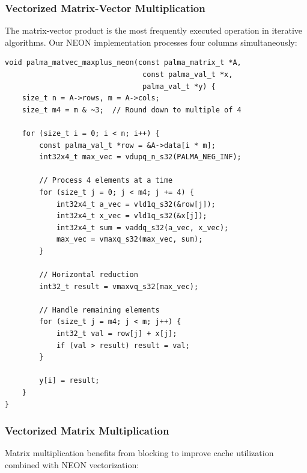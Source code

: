 \documentclass[11pt,a4paper]{article}
\theoremstyle{plain}
\theoremstyle{definition}
\begin{document}
\subsubsection{Vectorized Matrix-Vector Multiplication}

The matrix-vector product is the most frequently executed operation in iterative algorithms. Our NEON implementation processes four columns simultaneously:

\begin{lstlisting}[caption={NEON-optimized matrix-vector multiplication (max-plus)}]
void palma_matvec_maxplus_neon(const palma_matrix_t *A,
                                const palma_val_t *x,
                                palma_val_t *y) {
    size_t n = A->rows, m = A->cols;
    size_t m4 = m & ~3;  // Round down to multiple of 4
    
    for (size_t i = 0; i < n; i++) {
        const palma_val_t *row = &A->data[i * m];
        int32x4_t max_vec = vdupq_n_s32(PALMA_NEG_INF);
        
        // Process 4 elements at a time
        for (size_t j = 0; j < m4; j += 4) {
            int32x4_t a_vec = vld1q_s32(&row[j]);
            int32x4_t x_vec = vld1q_s32(&x[j]);
            int32x4_t sum = vaddq_s32(a_vec, x_vec);
            max_vec = vmaxq_s32(max_vec, sum);
        }
        
        // Horizontal reduction
        int32_t result = vmaxvq_s32(max_vec);
        
        // Handle remaining elements
        for (size_t j = m4; j < m; j++) {
            int32_t val = row[j] + x[j];
            if (val > result) result = val;
        }
        
        y[i] = result;
    }
}
\end{lstlisting}

\subsubsection{Vectorized Matrix Multiplication}

Matrix multiplication benefits from blocking to improve cache utilization combined with NEON vectorization:
\end{document}
